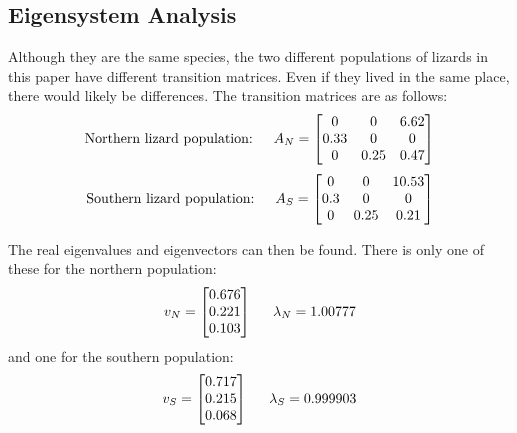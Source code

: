 \documentclass{article}
\begin{document}
    \subsection{Eigensystem Analysis}

    Although they are the same species, the two different populations of lizards in this paper have different transition matrices.
    Even if they lived in the same place, there would likely be differences.
    The transition matrices are as follows:
    \begin{equation}
        $Northern lizard population:\hspace{\parindent}$ A_N =
        \begin{bmatrix}
            0 & 0 & 6.62 \\
            0.33 & 0   & 0   \\
            0   & 0.25 & 0.47
        \end{bmatrix}
    \end{equation}
    \begin{equation}
        $Southern lizard population:\hspace{\parindent}$ A_S =
        \begin{bmatrix}
            0 & 0 & 10.53 \\
            0.3 & 0   & 0   \\
            0   & 0.25 & 0.21
        \end{bmatrix}
    \end{equation}


    The real eigenvalues and eigenvectors can then be found.
    There is only one of these for the northern population:
    \begin{equation}
        v_N = \begin{bmatrix}
                       0.676 \\
                       0.221 \\
                       0.103
        \end{bmatrix} \hspace{\parindent}\lambda_N = 1.00777
    \end{equation}
    and one for the southern population:
    \begin{equation}
        v_S = \begin{bmatrix}
                  0.717 \\
                  0.215 \\
                  0.068
        \end{bmatrix} \hspace{\parindent}\lambda_S = 0.999903
    \end{equation}
\end{document}
